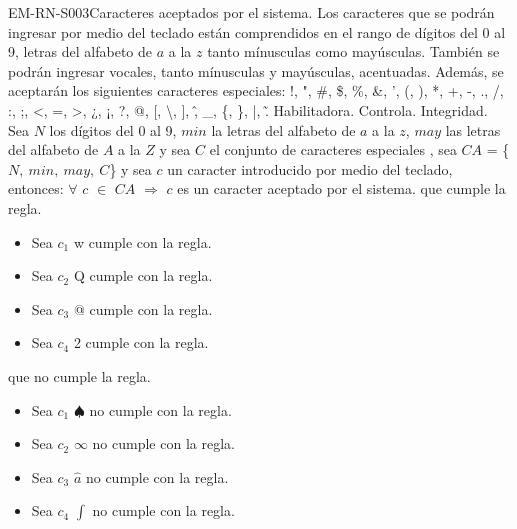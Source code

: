 \begin{BussinesRule}{EM-RN-S003}{Caracteres aceptados por el sistema.} 
	\BRitem[Descripción:] Los caracteres que se podrán ingresar por medio del teclado están comprendidos en 
	el rango de dígitos del 0 al 9, letras del alfabeto de $a$ a la $z$ tanto mínusculas como mayúsculas. 
	También se podrán ingresar vocales, tanto mínusculas y mayúsculas, acentuadas.
	Además, se aceptarán los siguientes caracteres especiales:
	!, ", \#, \$, \%, \&, ', (, ), *, +, -, ., /, :, ;, <, =, >, ¿, ¡, ?, @, [, \textbackslash,
	], \^, \_, \{, \}, |, \~.
	\BRitem[Tipo:] Habilitadora.
	\BRitem[Nivel:] Controla.
	\BRitem[Calse:] Integridad.
	\BRitem[Sentencia:] 
	Sea $N$ los dígitos del 0 al 9, $min$ la letras del alfabeto de $a$ a la $z$, $may$ las letras del
	alfabeto de $A$ a la $Z$ y sea $C$ el conjunto de caracteres especiales , sea 
	$CA$ = \{$ N, \:min, \:may, \:C $\} y sea $c$ un caracter introducido por medio del teclado, entonces:
	\newline
	$\forall$ $c$  $\in$ $CA$ $\Rightarrow$ $c$ es un caracter aceptado por el sistema.
	 que cumple la regla.
		\begin{itemize}
			\item Sea $c_{1}$ w cumple con la regla.
			\item Sea $c_{2}$ Q cumple con la regla.
			\item Sea $c_{3}$ @ cumple con la regla.
			\item Sea $c_{4}$ 2 cumple con la regla.
		\end{itemize}
	 que no cumple la regla.
		\begin{itemize}
			\item Sea $c_{1}$ $\spadesuit$ no cumple con la regla.
			\item Sea $c_{2}$ $\infty$ no cumple con la regla.
			\item Sea $c_{3}$ $\hat{a}$ no cumple con la regla.
			\item Sea $c_{4}$ $\int$ no cumple con la regla.
		\end{itemize}
\end{BussinesRule}


